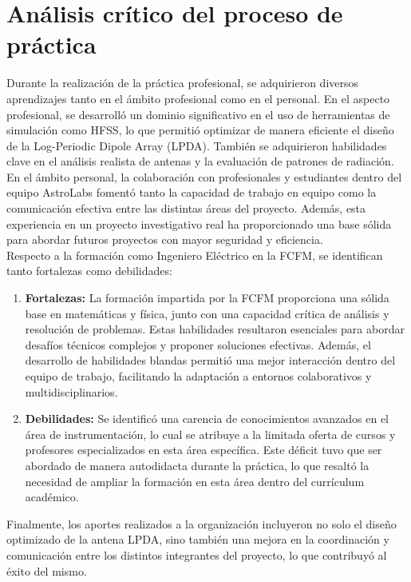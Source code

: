 \section{Análisis crítico del proceso de práctica}
Durante la realización de la práctica profesional, se adquirieron diversos aprendizajes tanto en el ámbito profesional como en el personal. En el aspecto profesional, se desarrolló un dominio significativo en el uso de herramientas de simulación como HFSS, lo que permitió optimizar de manera eficiente el diseño de la Log-Periodic Dipole Array (LPDA). También se adquirieron habilidades clave en el análisis realista de antenas y la evaluación de patrones de radiación. En el ámbito personal, la colaboración con profesionales y estudiantes dentro del equipo AstroLabs fomentó tanto la capacidad de trabajo en equipo como la comunicación efectiva entre las distintas áreas del proyecto. Además, esta experiencia en un proyecto investigativo real ha proporcionado una base sólida para abordar futuros proyectos con mayor seguridad y eficiencia.\\

Respecto a la formación como Ingeniero Eléctrico en la FCFM, se identifican tanto fortalezas como debilidades:

\begin{enumerate}
    \item \textbf{Fortalezas:} La formación impartida por la FCFM proporciona una sólida base en matemáticas y física, junto con una capacidad crítica de análisis y resolución de problemas. Estas habilidades resultaron esenciales para abordar desafíos técnicos complejos y proponer soluciones efectivas. Además, el desarrollo de habilidades blandas permitió una mejor interacción dentro del equipo de trabajo, facilitando la adaptación a entornos colaborativos y multidisciplinarios.
    \item \textbf{Debilidades:} Se identificó una carencia de conocimientos avanzados en el área de instrumentación, lo cual se atribuye a la limitada oferta de cursos y profesores especializados en esta área específica. Este déficit tuvo que ser abordado de manera autodidacta durante la práctica, lo que resaltó la necesidad de ampliar la formación en esta área dentro del currículum académico.
\end{enumerate}
Finalmente, los aportes realizados a la organización incluyeron no solo el diseño optimizado de la antena LPDA, sino también una mejora en la coordinación y comunicación entre los distintos integrantes del proyecto, lo que contribuyó al éxito del mismo.
\newpage
